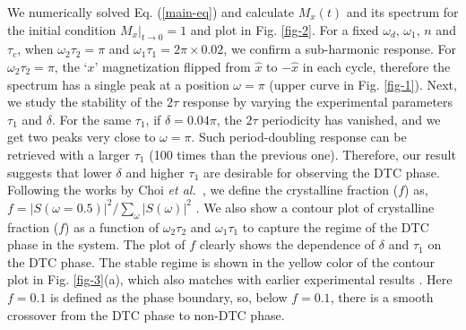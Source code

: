 \documentclass[prl,aps,twocolumn,floatfix]{revtex4-1}
\newcommand{\etal}{\textit{et al.\ }}
\newcommand{\stoo}{\vert_{t\rightarrow 0}}
\begin{document}
We numerically solved Eq. (\ref{main-eq}) and calculate $M_x(t)$ and its spectrum for the initial condition
$M_x\stoo = 1$ and plot in Fig. \ref{fig-2}. For a fixed $\omega_{d},\, \omega_1,\, n$ and $\tau_c$,
when $\omega_2 \tau_2 = \pi$ and $ \omega_1\tau_1 = 2\pi\times 0.02 $, we confirm a sub-harmonic response. For $\omega_2 \tau_2  = \pi$, the `$x$' magnetization flipped from $\hat{x}$ to $-\hat{x}$ in each
cycle, therefore the spectrum has a single peak at a position $\omega = \pi$ (upper curve in Fig.
\ref{fig-1}). Next, we study the stability of the $2\tau$ response by varying the experimental parameters
$\tau_1$ and $\delta$. For the same $\tau_1$, if $\delta = 0.04 \pi$, the $2\tau$ periodicity has vanished,
and we get two peaks very close to $\omega = \pi$. Such period-doubling response can be retrieved with a
larger $\tau_1$ (100 times than the previous one). Therefore, our result suggests that lower $\delta$ and
higher $\tau_1$ are desirable for observing the DTC phase. Following the works by Choi \etal, we define the
crystalline fraction ($f$) as, $f = \vert S(\omega = 0.5)\vert^2 / \sum_\omega \vert S(\omega )\vert^2$
\cite{choi_observation_2017}. We also show a contour plot of crystalline fraction ($f$) as a function of
$\omega_2 \tau_2 $ and $\omega_1 \tau_1$  to capture the regime of the DTC phase in the system. The plot of
$f$ clearly shows the dependence of $\delta$ and $\tau_1$  on the DTC phase. The stable regime is shown in
the yellow color of the contour plot in Fig. \ref{fig-3}(a),  which also matches with earlier experimental results
\cite{choi_observation_2017}. Here $f = 0.1$ is defined as the phase boundary, so, below $f = 0.1$, there is
a smooth crossover from the DTC phase to non-DTC phase.
\end{document}
